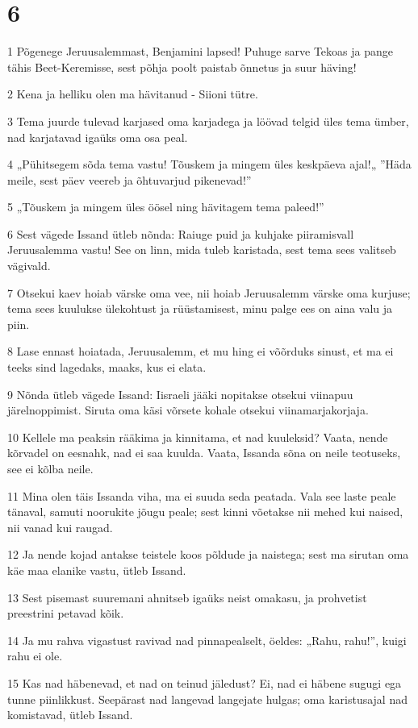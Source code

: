 \chapter{6}

\par 1 Põgenege Jeruusalemmast, Benjamini lapsed! Puhuge sarve Tekoas ja pange tähis Beet-Keremisse, sest põhja poolt paistab õnnetus ja suur häving!
\par 2 Kena ja helliku olen ma hävitanud - Siioni tütre.
\par 3 Tema juurde tulevad karjased oma karjadega ja löövad telgid üles tema ümber, nad karjatavad igaüks oma osa peal.
\par 4 „Pühitsegem sõda tema vastu! Tõuskem ja mingem üles keskpäeva ajal!„ ”Häda meile, sest päev veereb ja õhtuvarjud pikenevad!”
\par 5 „Tõuskem ja mingem üles öösel ning hävitagem tema paleed!”
\par 6 Sest vägede Issand ütleb nõnda: Raiuge puid ja kuhjake piiramisvall Jeruusalemma vastu! See on linn, mida tuleb karistada, sest tema sees valitseb vägivald.
\par 7 Otsekui kaev hoiab värske oma vee, nii hoiab Jeruusalemm värske oma kurjuse; tema sees kuulukse ülekohtust ja rüüstamisest, minu palge ees on aina valu ja piin.
\par 8 Lase ennast hoiatada, Jeruusalemm, et mu hing ei võõrduks sinust, et ma ei teeks sind lagedaks, maaks, kus ei elata.
\par 9 Nõnda ütleb vägede Issand: Iisraeli jääki nopitakse otsekui viinapuu järelnoppimist. Siruta oma käsi võrsete kohale otsekui viinamarjakorjaja.
\par 10 Kellele ma peaksin rääkima ja kinnitama, et nad kuuleksid? Vaata, nende kõrvadel on eesnahk, nad ei saa kuulda. Vaata, Issanda sõna on neile teotuseks, see ei kõlba neile.
\par 11 Mina olen täis Issanda viha, ma ei suuda seda peatada. Vala see laste peale tänaval, samuti noorukite jõugu peale; sest kinni võetakse nii mehed kui naised, nii vanad kui raugad.
\par 12 Ja nende kojad antakse teistele koos põldude ja naistega; sest ma sirutan oma käe maa elanike vastu, ütleb Issand.
\par 13 Sest pisemast suuremani ahnitseb igaüks neist omakasu, ja prohvetist preestrini petavad kõik.
\par 14 Ja mu rahva vigastust ravivad nad pinnapealselt, öeldes: „Rahu, rahu!”, kuigi rahu ei ole.
\par 15 Kas nad häbenevad, et nad on teinud jäledust? Ei, nad ei häbene sugugi ega tunne piinlikkust. Seepärast nad langevad langejate hulgas; oma karistusajal nad komistavad, ütleb Issand.
